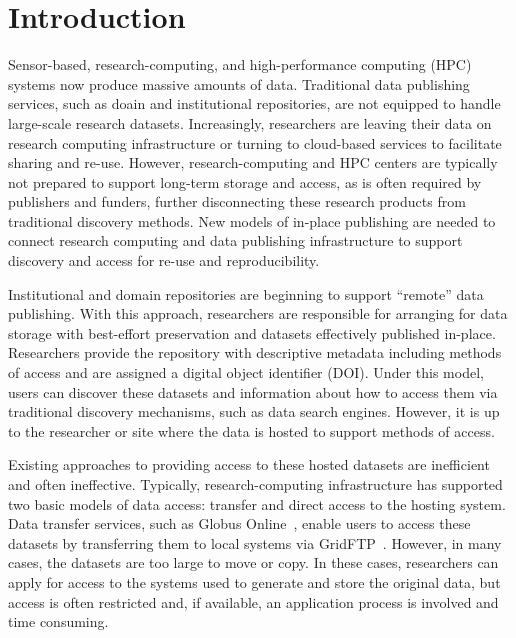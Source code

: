 \documentclass{sig-alternate}
\begin{document}
\section{Introduction}

Sensor-based, research-computing, and high-performance computing (HPC) systems now produce massive amounts of data.  Traditional data publishing services, such as doain and institutional repositories, are not equipped to handle large-scale research datasets.  Increasingly, researchers are leaving their data on research computing infrastructure or turning to cloud-based services to facilitate sharing and re-use. However, research-computing and HPC centers are typically not prepared to support long-term storage and access, as is often required by publishers and funders, further disconnecting these research products from traditional discovery methods. New models of in-place publishing are needed to connect research computing and data publishing infrastructure to support discovery and access for re-use and reproducibility.

Institutional and domain repositories are beginning to support ``remote'' data publishing.  With this approach, researchers are responsible for arranging for data storage with best-effort preservation and datasets effectively published in-place. Researchers provide the repository with descriptive metadata including methods of access and are assigned a digital object identifier (DOI).  Under this model, users can discover these datasets and information about how to access them via traditional discovery mechanisms, such as data search engines. However, it is up to the researcher or site where the data is hosted to support methods of access.

Existing approaches to providing access to these hosted datasets are inefficient and often ineffective.  Typically, research-computing infrastructure has supported two basic models of data access: transfer and direct access to the hosting system.  Data transfer services, such as Globus Online~\cite{Foster11}, enable users to access these datasets by transferring them to local systems via GridFTP~\cite{Allcock05}.  However, in many cases, the datasets are too large to move or copy. In these cases, researchers can apply for access to the systems used to generate and store the original data, but access is often restricted and, if available, an application process is involved and time consuming.
\end{document}
